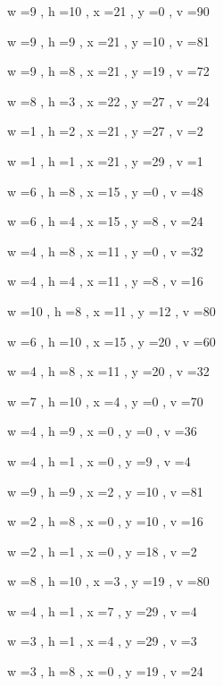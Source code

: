 \documentclass[11pt]{article}
\begin{document}


w =9 , h =10 , x =21 , y =0 , v =90
\par
w =9 , h =9 , x =21 , y =10 , v =81
\par
w =9 , h =8 , x =21 , y =19 , v =72
\par
w =8 , h =3 , x =22 , y =27 , v =24
\par
w =1 , h =2 , x =21 , y =27 , v =2
\par
w =1 , h =1 , x =21 , y =29 , v =1
\par
w =6 , h =8 , x =15 , y =0 , v =48
\par
w =6 , h =4 , x =15 , y =8 , v =24
\par
w =4 , h =8 , x =11 , y =0 , v =32
\par
w =4 , h =4 , x =11 , y =8 , v =16
\par
w =10 , h =8 , x =11 , y =12 , v =80
\par
w =6 , h =10 , x =15 , y =20 , v =60
\par
w =4 , h =8 , x =11 , y =20 , v =32
\par
w =7 , h =10 , x =4 , y =0 , v =70
\par
w =4 , h =9 , x =0 , y =0 , v =36
\par
w =4 , h =1 , x =0 , y =9 , v =4
\par
w =9 , h =9 , x =2 , y =10 , v =81
\par
w =2 , h =8 , x =0 , y =10 , v =16
\par
w =2 , h =1 , x =0 , y =18 , v =2
\par
w =8 , h =10 , x =3 , y =19 , v =80
\par
w =4 , h =1 , x =7 , y =29 , v =4
\par
w =3 , h =1 , x =4 , y =29 , v =3
\par
w =3 , h =8 , x =0 , y =19 , v =24
\par
\newpage
\end{document}
